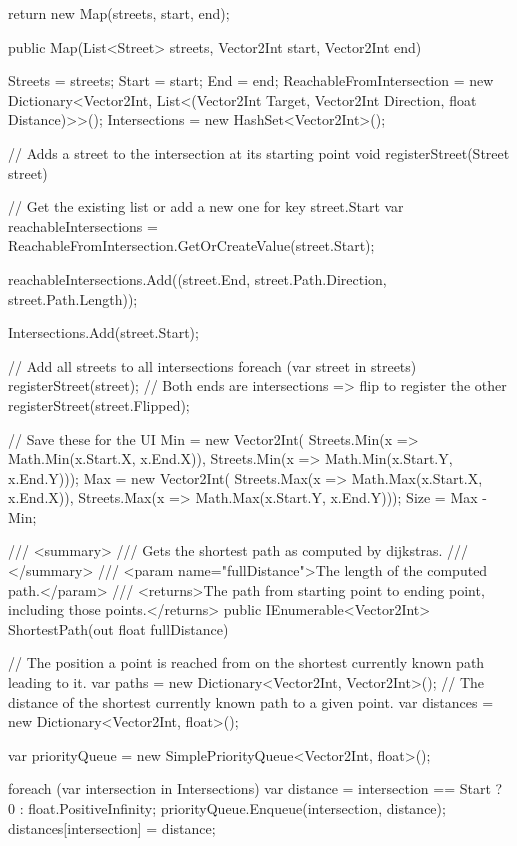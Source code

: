 \documentclass{article}
\begin{document}
\begin{lstcs}[]
{{        return new Map(streets, start, end);
    }

    public Map(List<Street> streets, Vector2Int start, Vector2Int end)
    {
        Streets = streets;
        Start = start;
        End = end;
        ReachableFromIntersection = new Dictionary<Vector2Int, List<(Vector2Int Target, Vector2Int Direction, float Distance)>>();
        Intersections = new HashSet<Vector2Int>();

        // Adds a street to the intersection at its starting point
        void registerStreet(Street street)
        {
            // Get the existing list or add a new one for key street.Start
            var reachableIntersections = ReachableFromIntersection.GetOrCreateValue(street.Start);

            reachableIntersections.Add((street.End, street.Path.Direction, street.Path.Length));

            Intersections.Add(street.Start);
        }

        // Add all streets to all intersections
        foreach (var street in streets)
        {
            registerStreet(street);
            // Both ends are intersections => flip to register the other
            registerStreet(street.Flipped);
        }

        // Save these for the UI
        Min = new Vector2Int(
            Streets.Min(x => Math.Min(x.Start.X, x.End.X)),
            Streets.Min(x => Math.Min(x.Start.Y, x.End.Y)));
        Max = new Vector2Int(
            Streets.Max(x => Math.Max(x.Start.X, x.End.X)),
            Streets.Max(x => Math.Max(x.Start.Y, x.End.Y)));
        Size = Max - Min;
    }

    /// <summary>
    /// Gets the shortest path as computed by dijkstras.
    /// </summary>
    /// <param name="fullDistance">The length of the computed path.</param>
    /// <returns>The path from starting point to ending point, including those points.</returns>
    public IEnumerable<Vector2Int> ShortestPath(out float fullDistance)
    {
        // The position a point is reached from on the shortest currently known path leading to it.
        var paths = new Dictionary<Vector2Int, Vector2Int>();
        // The distance of the shortest currently known path to a given point.
        var distances = new Dictionary<Vector2Int, float>();

        var priorityQueue = new SimplePriorityQueue<Vector2Int, float>();

        foreach (var intersection in Intersections)
        {
            var distance = intersection == Start ? 0 : float.PositiveInfinity;
            priorityQueue.Enqueue(intersection, distance);
            distances[intersection] = distance;
        }

}}
\end{lstcs}
\end{document}
